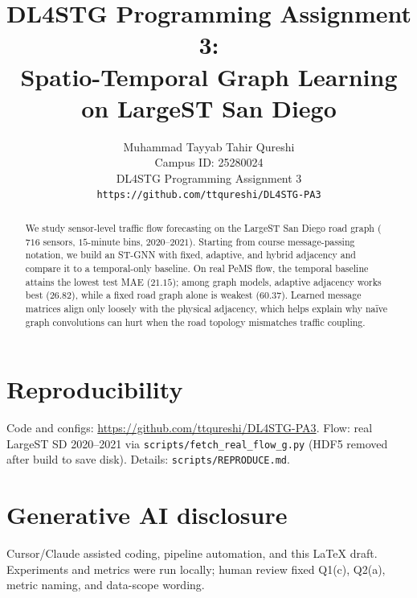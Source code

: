 \documentclass{article}
\title{DL4STG Programming Assignment 3:\\Spatio-Temporal Graph Learning on LargeST San Diego}
\author{%
  Muhammad Tayyab Tahir Qureshi\\
  Campus ID: 25280024\\
  DL4STG Programming Assignment 3\\
  \texttt{https://github.com/ttqureshi/DL4STG-PA3}
}
\begin{document}
\maketitle

\begin{abstract}
We study sensor-level traffic flow forecasting on the LargeST San Diego road graph ($716$ sensors, $15$-minute bins, $2020$--$2021$).
Starting from course message-passing notation, we build an ST-GNN with fixed, adaptive, and hybrid adjacency and compare it to a temporal-only baseline.
On real PeMS flow, the temporal baseline attains the lowest test MAE ($21.15$); among graph models, adaptive adjacency works best ($26.82$), while a fixed road graph alone is weakest ($60.37$).
Learned message matrices align only loosely with the physical adjacency, which helps explain why na\"ive graph convolutions can hurt when the road topology mismatches traffic coupling.
\end{abstract}



\section*{Reproducibility}
Code and configs: \url{https://github.com/ttqureshi/DL4STG-PA3}.
Flow: real LargeST SD 2020--2021 via \texttt{scripts/fetch\_real\_flow\_g.py} (HDF5 removed after build to save disk).
Details: \texttt{scripts/REPRODUCE.md}.

\section*{Generative AI disclosure}
Cursor/Claude assisted coding, pipeline automation, and this LaTeX draft. Experiments and metrics were run locally; human review fixed Q1(c), Q2(a), metric naming, and data-scope wording.
\end{document}
